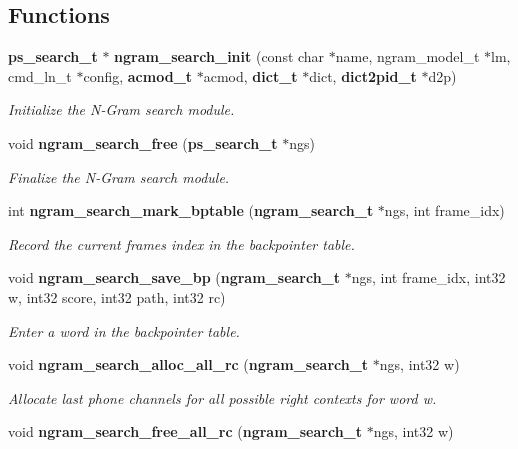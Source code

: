 \subsection*{Functions}
\begin{DoxyCompactItemize}
\item 
{\bf ps\+\_\+search\+\_\+t} $\ast$ {\bf ngram\+\_\+search\+\_\+init} (const char $\ast$name, ngram\+\_\+model\+\_\+t $\ast$lm, cmd\+\_\+ln\+\_\+t $\ast$config, {\bf acmod\+\_\+t} $\ast$acmod, {\bf dict\+\_\+t} $\ast$dict, {\bf dict2pid\+\_\+t} $\ast$d2p)\label{ngram__search_8h_a04f80b377c847026254fb85596e2f43c}

\begin{DoxyCompactList}\small\item\em Initialize the N-\/\+Gram search module. \end{DoxyCompactList}\item 
void {\bf ngram\+\_\+search\+\_\+free} ({\bf ps\+\_\+search\+\_\+t} $\ast$ngs)\label{ngram__search_8h_a9bafaa4af5a9a4f9e76a8daf54ac4a11}

\begin{DoxyCompactList}\small\item\em Finalize the N-\/\+Gram search module. \end{DoxyCompactList}\item 
int {\bf ngram\+\_\+search\+\_\+mark\+\_\+bptable} ({\bf ngram\+\_\+search\+\_\+t} $\ast$ngs, int frame\+\_\+idx)
\begin{DoxyCompactList}\small\item\em Record the current frame\textquotesingle{}s index in the backpointer table. \end{DoxyCompactList}\item 
void {\bf ngram\+\_\+search\+\_\+save\+\_\+bp} ({\bf ngram\+\_\+search\+\_\+t} $\ast$ngs, int frame\+\_\+idx, int32 w, int32 score, int32 path, int32 rc)\label{ngram__search_8h_ae36649be6f5a2190e759e7ed13bd7b6b}

\begin{DoxyCompactList}\small\item\em Enter a word in the backpointer table. \end{DoxyCompactList}\item 
void {\bf ngram\+\_\+search\+\_\+alloc\+\_\+all\+\_\+rc} ({\bf ngram\+\_\+search\+\_\+t} $\ast$ngs, int32 w)\label{ngram__search_8h_a1ddcc1a9cb3e164ceb2140097ed23a3e}

\begin{DoxyCompactList}\small\item\em Allocate last phone channels for all possible right contexts for word w. \end{DoxyCompactList}\item 
void {\bf ngram\+\_\+search\+\_\+free\+\_\+all\+\_\+rc} ({\bf ngram\+\_\+search\+\_\+t} $\ast$ngs, int32 w)\label{ngram__search_8h_a15477192481dffcb29e9c4167eff6c3c}


\end{DoxyCompactItemize}
